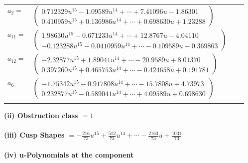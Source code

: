 \documentclass[1p]{elsarticle_modified}
\theoremstyle{definition}
\begin{document}
\begin{tabular}{m{7pt} m{180pt} m{7pt} m{180pt} }
\flushright $a_{2}=$&$\begin{pmatrix}0.712329 u^{15}-1.09589 u^{14}+\cdots+7.41096 u-1.86301\\0.410959 u^{15}+0.136986 u^{14}+\cdots+0.698630 u+1.23288\end{pmatrix}$ \\
\flushright $a_{11}=$&$\begin{pmatrix}1.98630 u^{15}-0.671233 u^{14}+\cdots+12.8767 u-4.04110\\-0.123288 u^{15}-0.0410959 u^{14}+\cdots-0.109589 u-0.369863\end{pmatrix}$ \\
\flushright $a_{12}=$&$\begin{pmatrix}-2.32877 u^{15}+1.89041 u^{14}+\cdots-20.9589 u+8.01370\\0.397260 u^{15}+0.465753 u^{14}+\cdots-0.424658 u+0.191781\end{pmatrix}$ \\
\flushright $a_{6}=$&$\begin{pmatrix}-1.75342 u^{15}-0.917808 u^{14}+\cdots-15.7808 u+4.73973\\0.232877 u^{15}-0.589041 u^{14}+\cdots+4.09589 u+0.698630\end{pmatrix}$\\&\end{tabular}
\flushleft \textbf{(ii) Obstruction class $= 1$}\\~\\
\flushleft \textbf{(iii) Cusp Shapes $= -\frac{216}{73} u^{15}+\frac{512}{73} u^{14}+\cdots-\frac{2163}{73} u+\frac{1031}{73}$}\\~\\
\newpage\renewcommand{\arraystretch}{1}
\flushleft \textbf{(iv) u-Polynomials at the component}\newline \\
\end{document}
